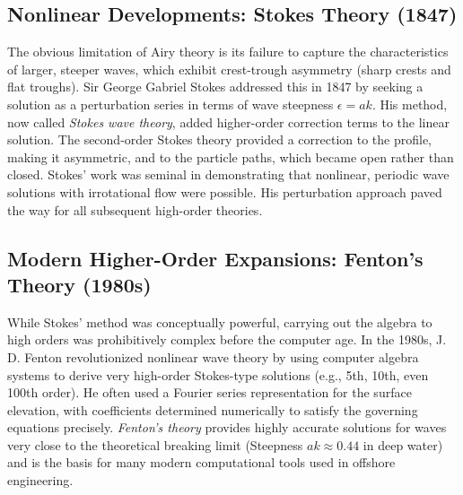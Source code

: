 \documentclass[11pt,a4paper]{article}
\begin{document}
\subsection{Nonlinear Developments: Stokes Theory (1847)}
The obvious limitation of Airy theory is its failure to capture the characteristics of larger, steeper waves, which exhibit crest-trough asymmetry (sharp crests and flat troughs). Sir George Gabriel Stokes addressed this in 1847 by seeking a solution as a perturbation series in terms of wave steepness $\epsilon = ak$. His method, now called \emph{Stokes wave theory}, added higher-order correction terms to the linear solution. The second-order Stokes theory provided a correction to the profile, making it asymmetric, and to the particle paths, which became open rather than closed. Stokes' work was seminal in demonstrating that nonlinear, periodic wave solutions with irrotational flow were possible. His perturbation approach paved the way for all subsequent high-order theories.

\subsection{Modern Higher-Order Expansions: Fenton's Theory (1980s)}
While Stokes' method was conceptually powerful, carrying out the algebra to high orders was prohibitively complex before the computer age. In the 1980s, J. D. Fenton revolutionized nonlinear wave theory by using computer algebra systems to derive very high-order Stokes-type solutions (e.g., 5th, 10th, even 100th order). He often used a Fourier series representation for the surface elevation, with coefficients determined numerically to satisfy the governing equations precisely. \emph{Fenton's theory} provides highly accurate solutions for waves very close to the theoretical breaking limit (Steepness $ak \approx 0.44$ in deep water) and is the basis for many modern computational tools used in offshore engineering.
\end{document}
